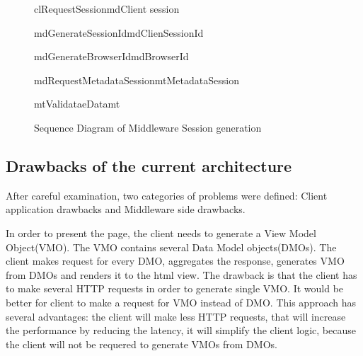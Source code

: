 \begin{figure}[h]
\begin{center}

	\resizebox{1.1\textwidth}{0.5\textwidth} {

	\begin{sequencediagram}

	\begin{call}{cl}{RequestSession}{md}{Client session}

		\begin{call}{md}{GenerateSessionId}{md}{ClienSessionId} \end{call}
		\begin{call}{md}{GenerateBrowserId}{md}{BrowserId} \end{call}
		\begin{call}{md}{RequestMetadataSession}{mt}{MetadataSession} 
			\begin{call}{mt}{ValidataeData}{mt}{}\end{call}
		\end{call}

	\end{call}

	\end{sequencediagram}
	}

\end{center}
\caption{Sequence Diagram of Middleware Session generation}
\label{fig:arch_sess_uml}
\end{figure}


\subsection{Drawbacks of the current architecture}

After careful examination, two categories of problems were defined: Client application drawbacks and Middleware side drawbacks. 

In order to present the page, the client needs to generate a View Model Object(VMO). The VMO contains several Data Model objects(DMOs). The client makes request for every DMO, aggregates the response, generates VMO from DMOs and renders it to the html view. The drawback is that the client has to make several HTTP requests in order to generate single VMO. It would be better for client to make a request for VMO instead of DMO. This approach has several advantages: the client will make less HTTP requests, that will increase the performance by reducing the latency, it will simplify the client logic, because the client will not be requered to generate VMOs from DMOs. 

